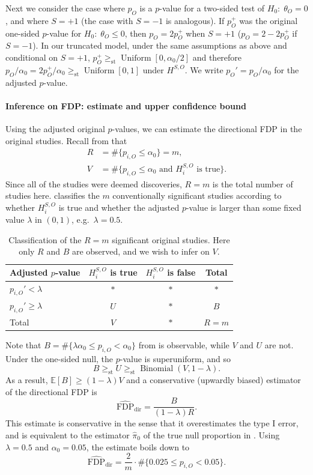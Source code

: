 \documentclass[aoas, preprint]{imsart}
\theoremstyle{definition}
\theoremstyle{custom}
\newcommand{\EE}{\mathbb{E}}
\DeclareMathOperator{\Binomial}{Binomial}
\DeclareMathOperator{\Uniform}{Uniform}
\newcommand{\hFDPd}{\widehat{\text{FDP}}_\text{dir}}
\newcommand{\ao}{\alpha_0}
\newcommand{\gest}{\ge_\text{st}}
\begin{document}
  Next we consider the case where $p_O$ is a $p$-value for a two-sided test of $H_0:\; \theta_O = 0$, and where $S = +1$ (the case with $S = -1$ is analogous). If $p_O^+$ was the original one-sided $p$-value for $H_0:\; \theta_O\le 0$, then $p_O = 2p_O^+$ when $S=+1$ ($p_O = 2 - 2p_O^+$ if $S = -1$). In our truncated model, under the same assumptions as above and conditional on $S = +1$, $p_O^+ \gest \Uniform[0, \ao/2]$ and therefore $p_O/\ao = 2p_O^+/\ao \gest \Uniform[0, 1]$ under $H^{S,O}$. We write $p_O'=p_O/\ao$ for the adjusted $p$-value.

  \paragraph{Inference on FDP: estimate and upper confidence bound} Using the adjusted original $p$-values, we can estimate the directional FDP in the original studies. Recall from  that
  \begin{align*}
    R &= \#\{p_{i,O} \le \ao\} = m,\\
    V &= \#\{p_{i,O} \le \ao \text{ and } H_i^{S,O} \text{ is true}\}.
  \end{align*}
  Since all of the studies were deemed discoveries, $R=m$ is the total number of studies here.  classifies the $m$ conventionally significant studies according to whether $H_i^{S,O}$ is true and whether the adjusted $p$-value is larger than some fixed value $\lambda$ in $(0,1)$, e.g.\ $\lambda = 0.5$.
  \begin{table}[htbp]
    \centering
    \begin{tabular}{lccc}
      \toprule
      Adjusted $p$-value & $H_i^{S,O}$ is true & $H_i^{S,O}$ is false & Total \\
      \midrule
      $p_{i,O}' < \lambda$ & $*$ & $*$ & $*$ \\
      $p_{i,O}' \ge \lambda$ & $U$ & $*$ & $B$ \\
      Total & $V$ & $*$ & $R = m$ \\
      \bottomrule
    \end{tabular}
    \caption{Classification of the $R=m$ significant original studies. Here only $R$ and $B$ are observed, and we wish to infer on $V$.}
  \label{tbl:err-fdp}
  \end{table}

  Note that $B = \#\{\lambda\ao \le p_{i,O} < \ao\}$ from  is observable, while $V$ and $U$ are not. Under the one-sided null, the $p$-value is superuniform, and so 
  \begin{equation}
    B \gest U \gest \Binomial(V, 1-\lambda).
  \label{eq:Bgest}
  \end{equation}
  As a result, $\EE[B] \ge (1-\lambda)V$ and a conservative (upwardly biased) estimator of the directional FDP is
  \[
    \hFDPd = \frac{B}{(1 - \lambda)R}.
  \]
  This estimate is conservative in the sense that it overestimates the type I error, and is equivalent to the estimator $\hat{\pi}_0$ of the true null proportion in \citet{Storey:2002vj}. Using $\lambda = 0.5$ and $\ao = 0.05$, the estimate boils down to
  \[
    \hFDPd = \frac{2}{m} \cdot \#\{0.025 \le p_{i,O} < 0.05\}.
  \]
\end{document}
